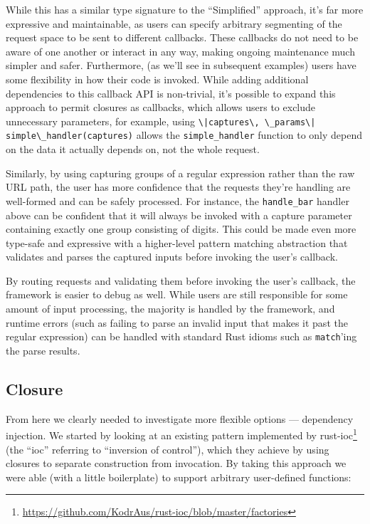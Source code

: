 \documentclass[sigconf]{acmart}
\def\code#1{\lstinline{#1}}
\begin{document}
\begin{minipage}{\linewidth}

\end{minipage}

While this has a similar type signature to the ``Simplified'' approach, it's far more expressive and maintainable, as users can specify arbitrary segmenting of the request space to be sent to different callbacks. These callbacks do not need to be aware of one another or interact in any way, making ongoing maintenance much simpler and safer. Furthermore, (as we'll see in subsequent examples) users have some flexibility in how their code is invoked. While adding additional dependencies to this callback API is non-trivial, it's possible to expand this approach to permit closures as callbacks, which allows users to exclude unnecessary parameters, for example, using \code{\|captures\, \_params\| simple\_handler(captures)} allows the \code{simple_handler} function to only depend on the data it actually depends on, not the whole request.

Similarly, by using capturing groups of a regular expression rather than the raw URL path, the user has more confidence that the requests they're handling are well-formed and can be safely processed. For instance, the \code{handle_bar} handler above can be confident that it will always be invoked with a capture parameter containing exactly one group consisting of digits. This could be made even more type-safe and expressive with a higher-level pattern matching abstraction that validates and parses the captured inputs before invoking the user's callback.

By routing requests and validating them before invoking the user's callback, the framework is easier to debug as well. While users are still responsible for some amount of input processing, the majority is handled by the framework, and runtime errors (such as failing to parse an invalid input that makes it past the regular expression) can be handled with standard Rust idioms such as \code{match}'ing the parse results.

\subsection{Closure}

From here we clearly needed to investigate more flexible options --- dependency injection. We started by looking at an existing pattern implemented by rust-ioc\footnote{\url{https://github.com/KodrAus/rust-ioc/blob/master/factories}} (the ``ioc'' referring to ``inversion of control''), which they achieve by using closures to separate construction from invocation. By taking this approach we were able (with a little boilerplate) to support arbitrary user-defined functions:
\end{document}

